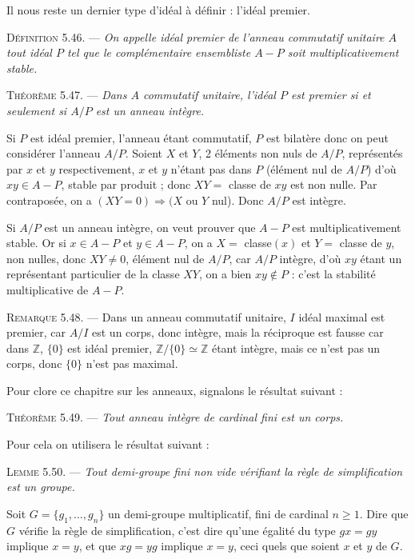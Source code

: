 Il nous reste un dernier type d'idéal à définir : l'idéal premier.

\medskip\noindent\textsc{Définition 5.46.} --- \emph{On appelle idéal premier de l'anneau commutatif unitaire $A$ tout idéal $P$ tel que le complémentaire ensembliste $A-P$ soit multiplicativement stable.}

\medskip\noindent\textsc{Théorème 5.47.} --- \emph{Dans $A$ commutatif unitaire, l'idéal $P$ est premier si et seulement si $A/P$ est un anneau intègre.}

Si $P$ est idéal premier, l'anneau étant commutatif, $P$ est bilatère donc on peut considérer l'anneau $A/P$. Soient $X$ et $Y$, 2 éléments non nuls de $A/P$, représentés par $x$ et $y$ respectivement, $x$ et $y$ n'étant pas dans $P$ (élément nul de $A/P$) d'où $xy\in A-P$, stable par produit ; donc $XY=$ classe de $xy$ est non nulle. Par contraposée, on a $(XY=0)\Rightarrow(X$ ou $Y$ nul). Donc $A/P$ est intègre.

Si $A/P$ est un anneau intègre, on veut prouver que $A-P$ est multiplicativement stable. Or si $x\in A-P$ et $y\in A-P$, on a $X=$ classe$(x)$ et $Y=$ classe de $y$, non nulles, donc $XY\ne0$, élément nul de $A/P$, car $A/P$ intègre, d'où $xy$ étant un représentant particulier de la classe $XY$, on a bien $xy\notin P$ : c'est la stabilité multiplicative de $A-P$. \bookend

\medskip\noindent\textsc{Remarque 5.48.} --- Dans un anneau commutatif unitaire, $I$ idéal maximal est premier, car $A/I$ est un corps, donc intègre, mais la réciproque est fausse car dans $\mathbb Z$, $\{0\}$ est idéal premier, $\mathbb Z/\{0\}\simeq\mathbb Z$ étant intègre, mais ce n'est pas un corps, donc $\{0\}$ n'est pas maximal.

Pour clore ce chapitre sur les anneaux, signalons le résultat suivant :

\medskip\noindent\textsc{Théorème 5.49.} --- \emph{Tout anneau intègre de cardinal fini est un corps.}

Pour cela on utilisera le résultat suivant :

\medskip\noindent\textsc{Lemme 5.50.} --- \emph{Tout demi-groupe fini non vide vérifiant la règle de simplification est un groupe.}

Soit $G=\{g_1,\ldots,g_n\}$ un demi-groupe multiplicatif, fini de cardinal $n\ge1$. Dire que $G$ vérifie la règle de simplification, c'est dire qu'une égalité du type $gx=gy$ implique $x=y$, et que $xg=yg$ implique $x=y$, ceci quels que soient $x$ et $y$ de $G$.

